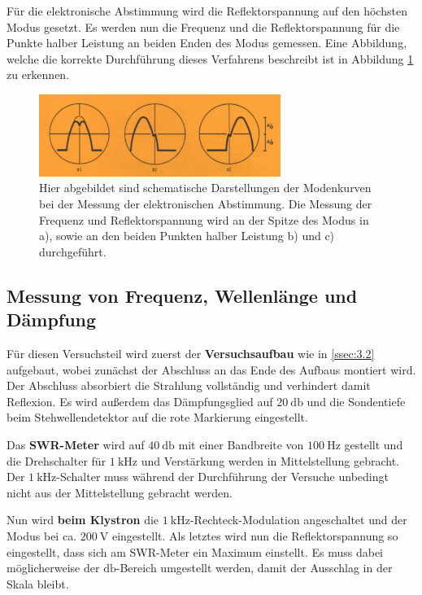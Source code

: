             Für die elektronische Abstimmung wird die Reflektorspannung auf den höchsten Modus gesetzt.
            Es werden nun die Frequenz und die Reflektorspannung für die Punkte halber Leistung an beiden Enden des Modus gemessen.
            Eine Abbildung, welche die korrekte Durchführung dieses Verfahrens beschreibt ist in Abbildung \ref{fig:7} zu erkennen.
            \begin{figure}[H]
                \centering
                \includegraphics[width=0.7\textwidth]{pics/abstimmung.png}
                \caption{Hier abgebildet sind schematische Darstellungen der Modenkurven bei der Messung der elektronischen Abstimmung. Die Messung der Frequenz und Reflektorspannung wird an der Spitze des Modus in a), sowie an den beiden Punkten halber Leistung b) und c) durchgeführt.\cite{Mikro}}
                \label{fig:7}
            \end{figure}

        \subsection{Messung von Frequenz, Wellenlänge und Dämpfung \label{ssec:4.2}}
            Für diesen Versuchsteil wird zuerst der \textbf{Versuchsaufbau} wie in \ref{ssec:3.2} aufgebaut, wobei zunächst der Abschluss an das Ende des Aufbaus montiert wird.
            Der Abschluss absorbiert die Strahlung vollständig und verhindert damit Reflexion.
            Es wird außerdem das Dämpfungsglied auf $\SI{20}{\decibel}$ und die Sondentiefe beim Stehwellendetektor  auf die rote Markierung eingestellt.

            Das \textbf{SWR-Meter} wird auf $\SI{40}{\decibel}$ mit einer Bandbreite von $\SI{100}{\hertz}$ gestellt und die Drehschalter für $\SI{1}{\kilo\hertz}$ und Verstärkung werden in Mittelstellung gebracht.
            Der $\SI{1}{\kilo\hertz}$-Schalter muss während der Durchführung der Versuche unbedingt nicht aus der Mittelstellung gebracht werden.
            
            Nun wird \textbf{beim Klystron} die $\SI{1}{\kilo\hertz}$-Rechteck-Modulation angeschaltet und der Modus bei ca. $\SI{200}{\volt}$ eingestellt.
            Als letztes wird nun die Reflektorspannung so eingestellt, dass sich am SWR-Meter ein Maximum einstellt.
            Es muss dabei möglicherweise der $\si{\decibel}$-Bereich umgestellt werden, damit der Ausschlag in der Skala bleibt.

